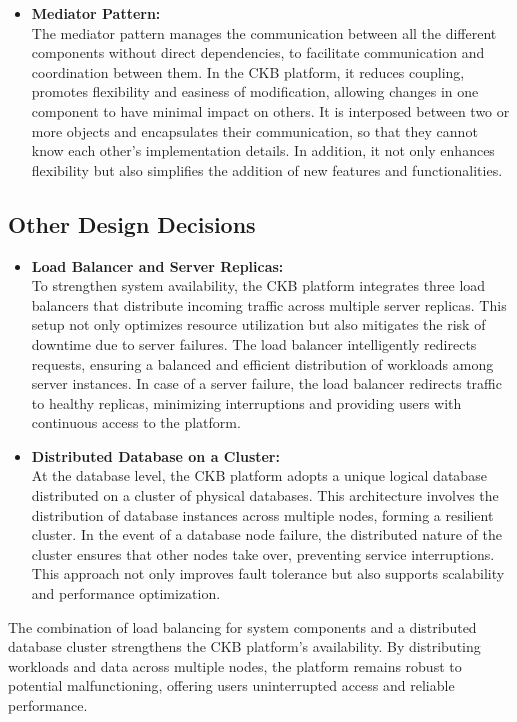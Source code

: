 \begin{itemize}
    \item \textbf{Mediator Pattern:} \\
    The mediator pattern manages the communication between all the different components without direct dependencies, to facilitate communication and coordination between them. In the CKB platform, it reduces coupling, promotes flexibility and easiness of modification, allowing changes in one component to have minimal impact on others. It is interposed between two or more objects and encapsulates their communication, so that they cannot know each other’s implementation details. In addition, it not only enhances flexibility but also simplifies the addition of new features and functionalities.

\end{itemize}

\subsection{Other Design Decisions}
\begin{itemize}
    \item \textbf{Load Balancer and Server Replicas:} \\
    To strengthen system availability, the CKB platform integrates three load balancers that distribute incoming traffic across multiple server replicas. This setup not only optimizes resource utilization but also mitigates the risk of downtime due to server failures. The load balancer intelligently redirects requests, ensuring a balanced and efficient distribution of workloads among server instances. In case of a server failure, the load balancer redirects traffic to healthy replicas, minimizing interruptions and providing users with continuous access to the platform.
    \item \textbf{Distributed Database on a Cluster:} \\
    At the database level, the CKB platform adopts a unique logical database distributed on a cluster of physical databases. This architecture involves the distribution of database instances across multiple nodes, forming a resilient cluster. In the event of a database node failure, the distributed nature of the cluster ensures that other nodes take over, preventing service interruptions. This approach not only improves fault tolerance but also supports scalability and performance optimization.
\end{itemize}
The combination of load balancing for system components and a distributed database cluster strengthens the CKB platform's availability. By distributing workloads and data across multiple nodes, the platform remains robust to potential malfunctioning, offering users uninterrupted access and reliable performance. 

